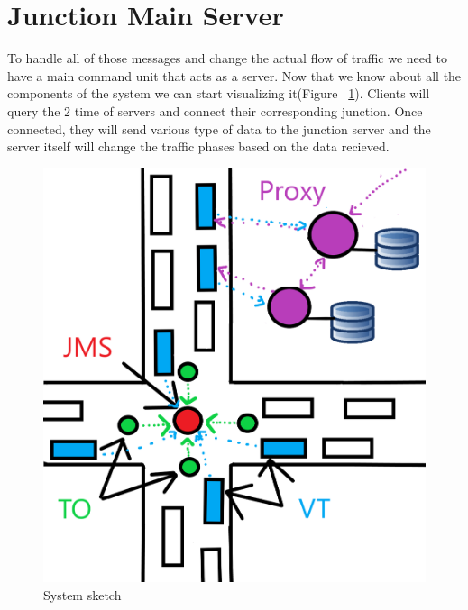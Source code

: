 \documentclass[17pt]{report}
\begin{document}
\section{Junction Main Server}
\indent \indent
To handle all of those messages and change the actual flow of traffic we
need to have a main command unit that acts as a server. Now 
that we know about all the components of the system we can 
start visualizing it(Figure ~\ref{fig:System_sketch}). Clients will query the 
2 time of servers and connect their corresponding junction. Once connected, 
they will send various type of data to the junction server and the server itself will
change the traffic phases based on the data recieved.

\begin{figure}[h!]
    \includegraphics[width=\textwidth]{Sketches/SchitaSistem.png}
    \caption{System sketch}
    \label{fig:System_sketch}
\end{figure}

\pagebreak
\end{document}
